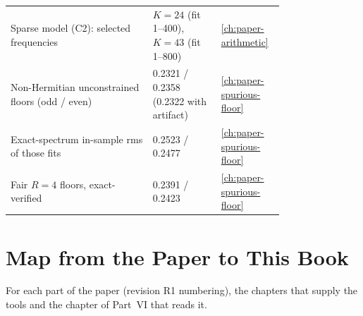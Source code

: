\begin{center}
\begin{tabular}{p{0.52\linewidth}p{0.25\linewidth}l}
Sparse model (C2): selected frequencies & $K=24$ (fit 1--400), $K=43$ (fit 1--800) & \ref{ch:paper-arithmetic}\\
Non-Hermitian unconstrained floors (odd / even) & 0.2321 / 0.2358 (0.2322 with artifact) & \ref{ch:paper-spurious-floor}\\
Exact-spectrum in-sample rms of those fits & 0.2523 / 0.2477 & \ref{ch:paper-spurious-floor}\\
Fair $R=4$ floors, exact-verified & 0.2391 / 0.2423 & \ref{ch:paper-spurious-floor}\\
\bottomrule
\end{tabular}
\end{center}

\renewcommand{\chapterart}{ap-claims}\renewcommand{\chapterartcaption}{How the 32 chapters lead into one another: an edge joins each chapter to the chapters it assumes.}
\chapter{Map from the Paper to This Book}\label{ch:ap-claims}

For each part of the paper \cite{soniR1} (revision R1 numbering), the chapters that supply the tools and the chapter of Part~VI that reads it.


